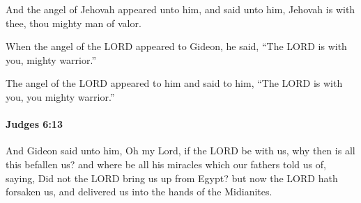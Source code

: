 			\begin{versebox}
					\item[BHS] 
					\item[ASV] And the angel of Jehovah appeared unto him, and said unto him, Jehovah is with thee, thou mighty man of valor.
					\item[NIV] When the angel of the LORD appeared to Gideon, he said, “The LORD is with you, mighty warrior.”
					\item[NRSV] The angel of the LORD appeared to him and said to him, “The LORD is with you, you mighty warrior.”
			\end{versebox}

		\paragraph{Judges 6:13} %
			\label{JUDGES-6-13}

			And Gideon said unto him, Oh my Lord, if the LORD be with us, why then is all this befallen us? and where be all his miracles which our fathers told us of, saying, Did not the LORD bring us up from Egypt? but now the LORD hath forsaken us, and delivered us into the hands of the Midianites.

